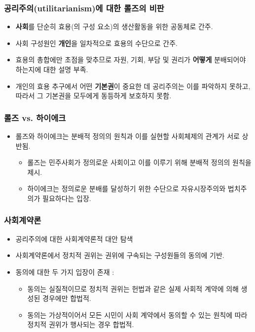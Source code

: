 \documentclass[aspectratio=169,xcolor=dvipsnames,handout]{beamer}
\begin{document}
\begin{frame}[<+->]
\frametitle{공리주의(utilitarianism)에 대한 롤즈의 비판}
    \begin{itemize}
        \item \textbf{사회}를 단순히 효용(의 구성 요소)의 생산활동을 위한 공동체로 간주.
        \item 사회 구성원인 \textbf{개인}을 일차적으로 효용의 수단으로 간주.
        \item 효용의 총합에만 초점을 맞추므로 자원, 기회, 부담 및 권리가 \textbf{어떻게} 분배되어야 하는지에 대한 설명 부족.
        \item 개인의 효용 추구에서 어떤 \textbf{기본권}이 중요한 데 공리주의는 이를 파악하지 못하고, 따라서 그 기본권을 모두에게 동등하게 보호하지 못함.
    \end{itemize}
\end{frame}
 
\begin{frame}[<+->]
\frametitle{롤즈 vs. 하이에크}
    \begin{itemize}
        \item 롤즈와 하이에크는 분배적 정의의 원칙과 이를 실현할 사회체제의 관계가 서로 상반됨.
        \begin{itemize}
            \item  롤즈는 민주사회가 정의로운 사회이고 이를 이루기 위해 분배적 정의의 원칙을 제시. 
            \item  하이에크는 정의로운 분배를 달성하기 위한 수단으로 자유시장주의와 법치주의가 필요하다는 입장. 
        \end{itemize}
    \end{itemize}
\end{frame}

\begin{frame}[<+->]
\frametitle{사회계약론}
    \begin{itemize}
        \item 공리주의에 대한 사회계약론적 대안 탐색
        \item 사회계약론에서 정치적 권위는 권위에 구속되는 구성원들의 동의에 기반. 
        \item 동의에 대한 두 가지 입장이 존재 :
        \begin{itemize}
            \item 동의는 실질적이므로 정치적 권위는 헌법과 같은 실제 사회적 계약에 의해 생성된 경우에만 합법적.
            \item 동의는 가상적이어서 모든 시민이 사회 계약에서 동의할 수 있는 원칙에 따라 정치적 권위가 행사되는 경우 합법적.
        \end{itemize}
    \end{itemize}
\end{frame}
\end{document}
